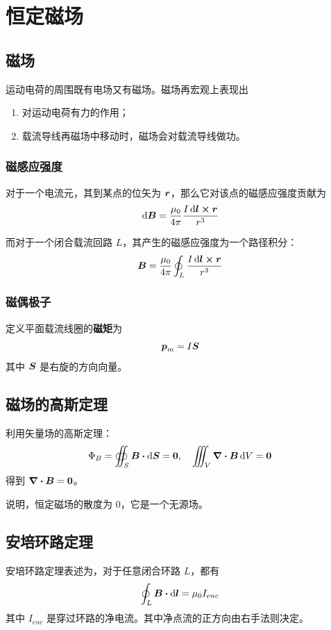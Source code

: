 \section{恒定磁场}

\subsection{磁场}

运动电荷的周围既有电场又有磁场。磁场再宏观上表现出
\begin{enumerate}
	\item 对运动电荷有力的作用；
	\item 载流导线再磁场中移动时，磁场会对载流导线做功。
\end{enumerate}

\subsubsection{磁感应强度}

\begin{theorem}[毕奥--萨伐尔定律]
	对于一个电流元，其到某点的位矢为 $\boldsymbol{r}$，那么它对该点的磁感应强度贡献为
	$$
	\dd{\vect{B}} = \frac{\mu_0}{4\pi} \frac{I \dd{\vect{l}} \cp \vect{r}}{r^3}
	$$
\end{theorem}

而对于一个闭合载流回路 $L$，其产生的磁感应强度为一个路径积分：
$$
\vect{B} = \frac{\mu_0}{4\pi} \oint_{L} \frac{I \dd{\vect{l}} \cp \vect{r}}{r^3}
$$

\subsubsection{磁偶极子}

\begin{definition}[面载流线圈的磁矩]
	定义平面载流线圈的\textbf{磁矩}为
	$$
	\boldsymbol{p}_m = I \boldsymbol{S}
	$$
	其中 $\boldsymbol{S}$ 是右旋的方向向量。
\end{definition}

\subsection{磁场的高斯定理}

利用矢量场的高斯定理：
$$
\Phi_B = \oiint_{S} \vect{B} \vdot \dd{\vect{S}} = \vect{0},\quad \iiint_V \div \vect{B} \dd{V} = \vect{0}
$$
得到 $\div \boldsymbol{B} = \boldsymbol{0}$。

说明，恒定磁场的散度为 $0$，它是一个无源场。

\subsection{安培环路定理}

安培环路定理表述为，对于任意闭合环路 $L$，都有
$$
\oint_L \vect{B} \vdot \dd{\vect{l}} = \mu_0 I_{enc}
$$
其中 $I_{enc}$ 是穿过环路的净电流。其中净点流的正方向由右手法则决定。
